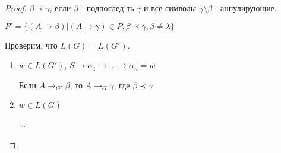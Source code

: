 \documentclass[11pt]{article}
\theoremstyle{break}
\newtheorem*{proof}{Доказательство:}
\begin{document}
\begin{sloppypar}
\begin{proof}
    $\beta \prec \gamma$, если $\beta$ - подпослед-ть $\gamma$ и все символы $\gamma \setminus \beta$ - аннулирующие.
    
    $P' = \{(A \rightarrow \beta)| (A \rightarrow \gamma) \in P, \beta \prec \gamma, \beta \neq \lambda\}$
    
    Проверим, что $L(G) = L(G')$.
    
    \begin{enumerate}
    \item $w \in L(G')$, $S \rightarrow \alpha_1 \rightarrow ... \rightarrow \alpha_n = w$
    
      Если $A \rightarrow_{G'} \beta$, то $A \rightarrow_G \gamma$, где $\beta \prec \gamma$
    
    \item $w \in L(G)$
    
      ...
    \end{enumerate}
  \end{proof}
\end{sloppypar}
\end{document}
